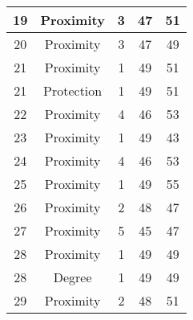 \documentclass[results.tex]{subfiles}
\begin{document}
\begin{center}
\begin{tabular}{| c || c | c | c | c |}
            \hline
            19                      & Proximity                    & 3                      & 47                      & 51                   \\
            \hline
            20                      & Proximity                    & 3                      & 47                      & 49                   \\
            \hline
            21                      & Proximity                    & 1                      & 49                      & 51                   \\
            \hline
            21                      & Protection                   & 1                      & 49                      & 51                   \\
            \hline
            22                      & Proximity                    & 4                      & 46                      & 53                   \\
            \hline
            23                      & Proximity                    & 1                      & 49                      & 43                   \\
            \hline
            24                      & Proximity                    & 4                      & 46                      & 53                   \\
            \hline
            25                      & Proximity                    & 1                      & 49                      & 55                   \\
            \hline
            26                      & Proximity                    & 2                      & 48                      & 47                   \\
            \hline
            27                      & Proximity                    & 5                      & 45                      & 47                   \\
            \hline
            28                      & Proximity                    & 1                      & 49                      & 49                   \\
            \hline
            28                      & Degree                       & 1                      & 49                      & 49                   \\
            \hline
            29                      & Proximity                    & 2                      & 48                      & 51                   \\

\end{tabular}
\end{center}
\end{document}

